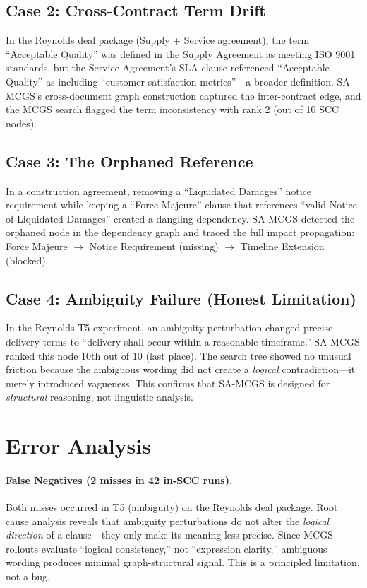 \documentclass{article}
\begin{document}
\subsection{Case 2: Cross-Contract Term Drift}
In the Reynolds deal package (Supply + Service agreement), the term ``Acceptable Quality'' was defined in the Supply Agreement as meeting ISO 9001 standards, but the Service Agreement's SLA clause referenced ``Acceptable Quality'' as including ``customer satisfaction metrics''---a broader definition. SA-MCGS's cross-document graph construction captured the inter-contract edge, and the MCGS search flagged the term inconsistency with rank 2 (out of 10 SCC nodes).

\subsection{Case 3: The Orphaned Reference}
In a construction agreement, removing a ``Liquidated Damages'' notice requirement while keeping a ``Force Majeure'' clause that references ``valid Notice of Liquidated Damages'' created a dangling dependency. SA-MCGS detected the orphaned node in the dependency graph and traced the full impact propagation: Force Majeure $\to$ Notice Requirement (missing) $\to$ Timeline Extension (blocked).

\subsection{Case 4: Ambiguity Failure (Honest Limitation)}
In the Reynolds T5 experiment, an ambiguity perturbation changed precise delivery terms to ``delivery shall occur within a reasonable timeframe.'' SA-MCGS ranked this node 10th out of 10 (last place). The search tree showed no unusual friction because the ambiguous wording did not create a \emph{logical} contradiction---it merely introduced vagueness. This confirms that SA-MCGS is designed for \emph{structural} reasoning, not linguistic analysis.

\section{Error Analysis}

\paragraph{False Negatives (2 misses in 42 in-SCC runs).}
Both misses occurred in T5 (ambiguity) on the Reynolds deal package. Root cause analysis reveals that ambiguity perturbations do not alter the \emph{logical direction} of a clause---they only make its meaning less precise. Since MCGS rollouts evaluate ``logical consistency,'' not ``expression clarity,'' ambiguous wording produces minimal graph-structural signal. This is a principled limitation, not a bug.
\end{document}
